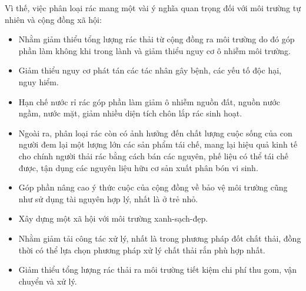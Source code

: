 Vì thế, việc phân loại rác mang một vài ý nghĩa quan trọng đối với môi trường tự nhiên và cộng đồng xã hội:
\begin{itemize}
    \item Nhằm giảm thiểu tổng lượng rác thải từ cộng đồng ra môi trường do đó góp phần làm không khi trong lành và giảm thiểu nguy cơ ô nhiễm môi trường. 
    \item Giảm thiểu nguy cơ phát tán các tác nhân gây bệnh, các yếu tố độc hại, nguy hiểm. 
    \item Hạn chế nước rỉ rác góp phần làm giảm ô nhiễm nguồn đất, nguồn nước ngầm, nước mặt, giảm nhiều diện tích chôn lắp rác sinh hoạt. 
    \item Ngoài ra, phân loại rác còn có ảnh hưởng đến chất lượng cuộc sống của con người đem lại một lượng lớn các sản phẩm tái chế, mang lại hiệu quả kinh tế cho chính người thải rác bằng cách bán các nguyên, phế liệu có thể tái chế được, tận dụng các nguyên liệu hữu cơ sản xuất phân bón vi sinh.
    \item Góp phần nâng cao ý thức cuộc của cộng đồng về bảo vệ môi trường cũng như sử dụng tài nguyên hợp lý, nhất là ở trẻ nhỏ.
    \item Xây dựng một xã hội với môi trường xanh-sạch-đẹp.
    \item Nhằm giảm tải công tác xử lý, nhất là trong phương pháp đốt chất thải, đồng thời có thể lựa chọn phương pháp xử lý chất thải rắn phù hợp nhất.
    \item Giảm thiểu tổng lượng rác thải ra môi trường tiết kiệm chi phí thu gom, vận chuyển và xử lý.    
\end{itemize}


